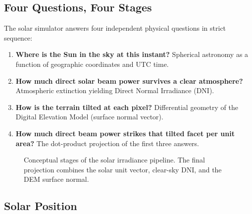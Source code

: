 \documentclass[11pt,a4paper]{article}
\begin{document}
\subsection{Four Questions, Four Stages}

The solar simulator answers four independent physical questions in strict sequence:
\begin{enumerate}
  \item \textbf{Where is the Sun in the sky at this instant?} Spherical astronomy as a function of geographic coordinates and UTC time.
  \item \textbf{How much direct solar beam power survives a clear atmosphere?} Atmospheric extinction yielding Direct Normal Irradiance (DNI).
  \item \textbf{How is the terrain tilted at each pixel?} Differential geometry of the Digital Elevation Model (surface normal vector).
  \item \textbf{How much direct beam power strikes that tilted facet per unit area?} The dot-product projection of the first three answers.
\end{enumerate}

\begin{figure}[htbp]
\centering
{}
\caption{Conceptual stages of the solar irradiance pipeline. The final projection combines the solar unit vector, clear-sky DNI, and the DEM surface normal.}
\label{fig:cadena-solar}
\end{figure}

\subsection{Solar Position}
\end{document}
